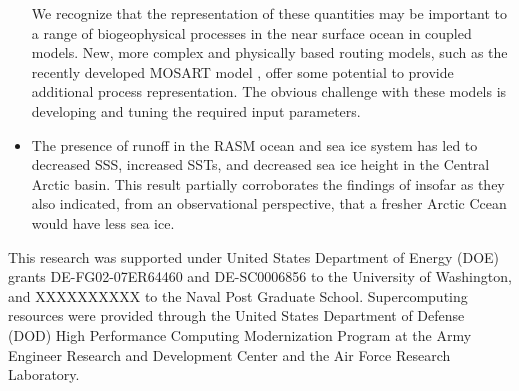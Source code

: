 \documentclass[jgrga, draft]{agutex}
\begin{document}
\begin{article}
\begin{itemize}
We recognize that the representation of these quantities may be important to a range of biogeophysical processes in the near surface ocean in coupled models.
New, more complex and physically based routing models, such as the recently developed MOSART model \citep{Li_2013}, offer some potential to provide additional process representation.
The obvious challenge with these models is developing and tuning the required input parameters.
\item The presence of runoff in the RASM ocean and sea ice system has led to decreased SSS, increased SSTs, and decreased sea ice height in the Central Arctic basin.
This result partially corroborates the findings of \citep{Morison_2012} insofar as they also indicated, from an observational perspective, that a fresher Arctic Ccean would have less sea ice.

\end{itemize}

%
%
%


\begin{acknowledgments}
This research was supported under United States Department of Energy (DOE) grants DE-FG02-07ER64460 and DE-SC0006856 to the University of Washington, and XXXXXXXXXX to the Naval Post Graduate School.
Supercomputing resources were provided through the United States Department of Defense (DOD) High Performance Computing Modernization Program at the Army Engineer Research and Development Center and the Air Force Research Laboratory.
\end{acknowledgments}





%
%
\end{article}
\end{document}
